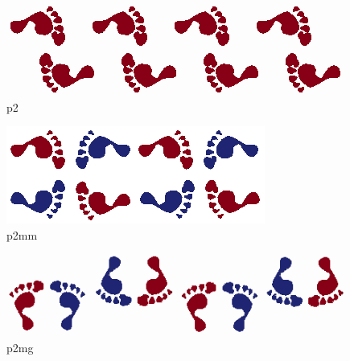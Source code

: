 \documentclass[class=article, crop=false]{standalone}
\begin{document}
    \vfill
    \begin{subfigure}{0.21\linewidth}
            \centering
	        \includegraphics[width=\linewidth,angle=90]{Figures/Frieze groups/Frieze_spinning_hop.png}
	        \caption{p2}
	        \label{fig:p2}
    \end{subfigure}
    \begin{subfigure}{0.21\linewidth}
            \centering
	        \includegraphics[width=\linewidth,angle=90]{Figures/Frieze groups/Frieze_spinning_jump.png}
	        \caption{p2mm}
	        \label{fig:p2mm}
    \end{subfigure}
    \begin{subfigure}{0.21\linewidth}
            \centering
	        \includegraphics[width=\linewidth,angle=90]{Figures/Frieze groups/Frieze_spinning_sidle.png}
	        \caption{p2mg}
	        \label{fig:subfigC}
    \end{subfigure}

    
\end{document}
